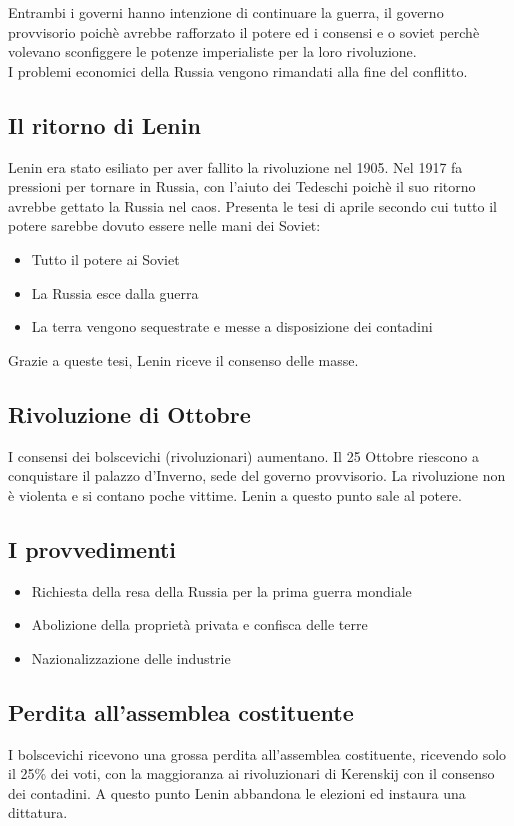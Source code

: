 \documentclass{article}
\begin{document}
Entrambi i governi hanno intenzione di continuare la guerra, il governo provvisorio
poichè avrebbe rafforzato il potere ed i consensi e o soviet perchè volevano sconfiggere
le potenze imperialiste per la loro rivoluzione.\\
I problemi economici della Russia vengono rimandati alla fine del conflitto.

\subsection{Il ritorno di Lenin}
Lenin era stato esiliato per aver fallito la rivoluzione nel 1905. Nel 1917 fa pressioni 
per tornare in Russia, con l'aiuto dei Tedeschi poichè il suo ritorno avrebbe gettato
la Russia nel caos.
Presenta le tesi di aprile secondo cui tutto il potere sarebbe dovuto essere nelle mani
dei Soviet:

\begin{itemize}
    \item Tutto il potere ai Soviet
    \item La Russia esce dalla guerra
    \item La terra vengono sequestrate e messe a disposizione dei contadini
\end{itemize}

Grazie a queste tesi, Lenin riceve il consenso delle masse.

\subsection{Rivoluzione di Ottobre}
I consensi dei bolscevichi (rivoluzionari) aumentano. Il 25 Ottobre riescono
a conquistare il palazzo d'Inverno, sede del governo provvisorio. La rivoluzione
non è violenta e si contano poche vittime. Lenin a questo punto sale al potere.

\subsection{I provvedimenti}

\begin{itemize}
    \item Richiesta della resa della Russia per la prima guerra mondiale
    \item Abolizione della proprietà privata e confisca delle terre
    \item Nazionalizzazione delle industrie
\end{itemize}

\subsection{Perdita all'assemblea costituente}
I bolscevichi ricevono una grossa perdita all'assemblea costituente, ricevendo
solo il 25\% dei voti, con la maggioranza ai rivoluzionari di Kerenskij con il
consenso dei contadini. A questo punto Lenin abbandona le elezioni ed instaura
una dittatura.
\end{document}
